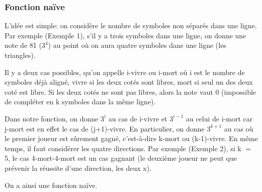 \documentclass[12pt, a4paper]{article}
\begin{document}
\subsubsection{Fonction naïve}
L'idée est simple: on considère le nombre de symboles non séparés dans une ligne. Par exemple (Exemple 1), s'il y a trois symboles dans une ligne, on donne une note de 81 ($3^{4}$) au point où on aura quatre symboles dans une ligne (les triangles).
\begin{center}
\end{center}
Il y a deux cas possibles, qu'on appelle i-vivre ou i-mort où i est le nombre de symboles déjà aligné, vivre si les deux cotés sont libres, mort si seul un des deux coté est libre. Si les deux cotés ne sont pas libres, alors la note vaut 0 (impossible de compléter en k symboles dans la même ligne).
\begin{center}
\end{center}
\begin{center}
\end{center}
Dans notre fonction, on donne $3^{i}$ au cas de i-vivre et $3^{i-1}$ au celui de i-mort car j-mort est en effet le cas de (j$+$1)-vivre. En particulier, on donne $3^{k+1}$ au cas où le premier joueur est sûrement gagné, c'est-à-dire k-mort ou (k-1)-vivre. En même temps, il faut considérer les quatre directions. Par exemple (Exemple 2), si k $=$ 5, le cas 4-mort-4-mort est un cas gagnant (le deuxième joueur ne peut que prévenir la réussite d'une direction, les deux x).
\cleargoban
\begin{center}
\end{center}
On a ainsi une fonction naïve.
\end{document}
